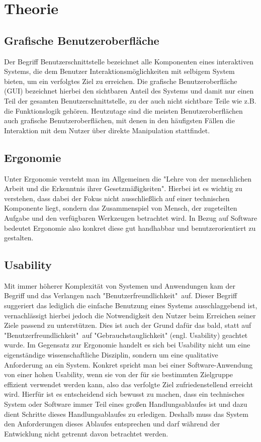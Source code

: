 \chapter{Theorie}\label{ch:data}

\section{Grafische Benutzeroberfläche}
Der Begriff Benutzerschnittstelle bezeichnet alle Komponenten eines interaktiven Systems, die dem Benutzer Interaktionsmöglichkeiten mit selbigem System bieten, um ein verfolgtes Ziel zu erreichen.
Die grafische Benutzeroberfläche (GUI) bezeichnet hierbei den sichtbaren Anteil des Systems und damit nur einen Teil der gesamten Benutzerschnittstelle, zu der auch nicht sichtbare Teile wie z.B. die Funktionslogik gehören\cite{Sarodnick.2016}.
Heutzutage sind die meisten Benutzeroberflächen auch grafische Benutzeroberflächen, mit denen in den häufigsten Fällen die Interaktion mit dem Nutzer über direkte Manipulation stattfindet\cite{Nielsen.1995?}.

\section{Ergonomie}
Unter Ergonomie versteht man im Allgemeinen die "Lehre von der menschlichen Arbeit und die Erkenntnis ihrer Gesetzmäßigkeiten"\cite{https:www.facebook.comArbeitsplatzergonomie.2014}.
Hierbei ist es wichtig zu verstehen, dass dabei der Fokus nicht ausschließlich auf einer technischen Komponente liegt, sondern das Zusammenspiel von Mensch, der zugeteilten Aufgabe und den verfügbaren Werkzeugen betrachtet wird\cite{Sarodnick.2016}.
In Bezug auf Software bedeutet Ergonomie also konkret diese gut handhabbar und benutzerorientiert zu gestalten.

\section{Usability}
Mit immer höherer Komplexität von Systemen und Anwendungen kam der Begriff und das Verlangen nach  "Benutzerfreundlichkeit"\ auf.
Dieser Begriff suggeriert das lediglich die einfache Benutzung eines Systems ausschlaggebend ist, vernachlässigt hierbei jedoch die Notwendigkeit den Nutzer beim Erreichen seiner Ziele passend zu unterstützen.
Dies ist auch der Grund dafür das bald, statt auf "Benutzerfreundlichkeit"\ auf "Gebrauchstauglichkeit" (engl. Usability) geachtet wurde.
Im Gegensatz zur Ergonomie handelt es sich bei Usability nicht um eine eigenständige wissenschaftliche Disziplin, sondern um eine qualitative Anforderung an ein System\cite{Sarodnick.2016}.
Konkret spricht man bei einer Software-Anwendung von einer hohen Usability, wenn sie von der für sie bestimmten Zielgruppe effizient verwendet werden kann, also das verfolgte Ziel zufriedenstellend erreicht wird\cite{Richter.2016}.
Hierfür ist es entscheidend sich bewusst zu machen, dass ein technisches System oder Software immer Teil eines großen Handlungsablaufes ist und dazu dient Schritte dieses Handlungsablaufes zu erledigen.
Deshalb muss das System den Anforderungen dieses Ablaufes entsprechen und darf während der Entwicklung nicht getrennt davon betrachtet werden\cite{Sarodnick.2016}.

